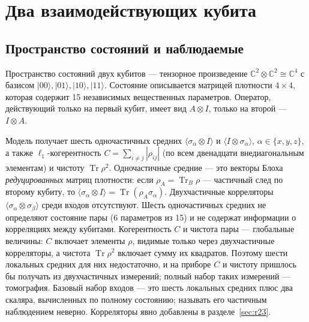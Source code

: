 \documentclass[12pt,a4paper]{report}
\numberwithin{equation}{chapter}
\newcommand{\Tr}{\operatorname{Tr}}
\newcommand{\ket}[1]{|#1\rangle}
\begin{document}
\chapter{Два взаимодействующих кубита}
\label{chap:twoqubits}

\section{Пространство состояний и наблюдаемые}
\label{sec:2q_obs}

Пространство состояний двух кубитов --- тензорное произведение
$\mathbb C^2\otimes\mathbb C^2\cong\mathbb C^4$ с базисом
$\ket{00},\ket{01},\ket{10},\ket{11}$. Состояние описывается матрицей плотности
$4\times4$, которая содержит 15 независимых вещественных параметров.
Оператор, действующий только на первый кубит, имеет вид $A\otimes I$, только на
второй --- $I\otimes A$.

Модель получает шесть одночастичных средних
$\langle\sigma_\alpha\otimes I\rangle$ и $\langle I\otimes\sigma_\alpha\rangle$,
$\alpha\in\{x,y,z\}$, а также $\ell_1$-когерентность $C=\sum_{i\neq j}|\rho_{ij}|$
(по всем двенадцати внедиагональным элементам) и чистоту $\Tr\rho^2$.
Одночастичные средние --- это векторы Блоха \emph{редуцированных} матриц
плотности: если $\rho_A=\Tr_B\rho$ --- частичный след по второму кубиту, то
$\langle\sigma_\alpha\otimes I\rangle=\Tr(\rho_A\sigma_\alpha)$. Двухчастичные
корреляторы $\langle\sigma_\alpha\otimes\sigma_\beta\rangle$ среди входов
отсутствуют. Шесть одночастичных средних не определяют состояние пары (6
параметров из 15) и не содержат информации о корреляциях между кубитами.
Когерентность $C$ и чистота пары --- глобальные величины: $C$ включает
элементы $\rho$, видимые только через двухчастичные корреляторы, а чистота
$\Tr\rho^2$ включает сумму их квадратов. Поэтому шести локальных средних для
них недостаточно, и на приборе $C$ и чистоту пришлось бы получать из
двухчастичных измерений; полный набор таких измерений --- томография.
Базовый набор входов --- это шесть локальных средних плюс два скаляра,
вычисленных по полному состоянию; называть его частичным наблюдением
неверно. Корреляторы явно добавлены в разделе~\ref{sec:r23}.
\end{document}

